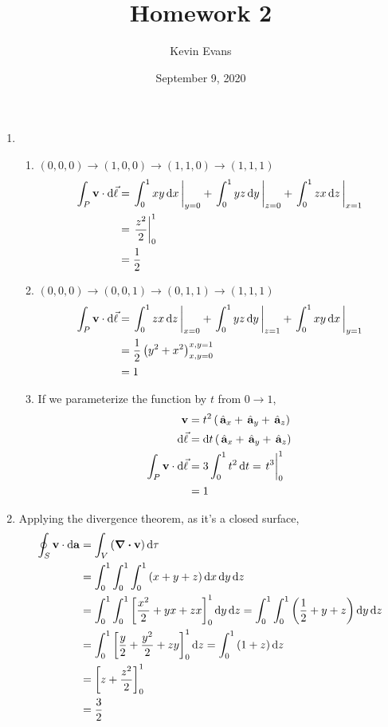 \documentclass{homework}
\title{Homework 2}
\author{Kevin Evans}
\date{September 9, 2020}
\begin{document}
	\maketitle

	\begin{enumerate}
		\item \begin{enumerate}
			\item $(0, 0, 0) \to (1, 0, 0) \to (1, 1, 0) \to (1, 1, 1)$ \begin{align*}
				\int_P \bvec{v} \cdot \dd{\vec{\ell}} & = \eval{\int_0^1 xy \dd{x}}_{y=0} + \eval{\int_0^1 yz \dd{y}}_{z=0} + \eval{\int_0^1 zx \dd{z}}_{x=1} \\
					& = \eval{\frac{z^2}{2}}_0^1 \\
					& = \frac{1}{2}
			\end{align*}
		
			\item $(0, 0, 0) \to (0, 0, 1) \to (0, 1, 1) \to (1, 1, 1)$
			\begin{align*}
				\int_P \bvec{v} \cdot \dd{\vec{\ell}} & = \eval{\int_0^1 zx \dd{z}}_{x=0} + \eval{\int_0^1 yz \dd{y}}_{z=1} + \eval{\int_{0}^{1} xy \dd{x}}_{y=1} \\
					& = \frac{1}{2} \left( y^2 + x^2 \right)_{x,y=0}^{x,y=1} \\
					& = 1
			\end{align*}
		
			\item If we parameterize the function by $t$ from $0 \to 1$, \begin{align*}
				\bvec{v} & = t^2 \left( \uvec{x} + \uvec{y} + \uvec{z}\right) \\
				\dd{\vec{\ell}} & = \dd{t} \left( \uvec{x} + \uvec{y} + \uvec{z} \right) \\
				\int_P \bvec{v} \cdot \dd{\vec{\ell}} & = 3 \int_{0}^1 t^2 \dd{t} = \eval{ t^3 }_0^1 \\
					& = 1
			\end{align*}
		\end{enumerate}
	
		\item Applying the divergence theorem, as it's a closed surface, \begin{align*}
			\oint_S \boldsymbol{\mathrm{v}} \cdot \dd{ \boldsymbol{\mathrm{a}} } & = \int_V \left(\div{ \boldsymbol{\mathrm{v}} }\right)  \dd{\tau} \\
				& = \int_0^1 \int_0^1 \int_0^1 \left( x + y + z\right) \dd{x} \dd{y} \dd{z} \\
				& = \int_0^1 \int_0^1 \left[ \frac{x^2}{2} + yx + zx\right]_0^1 \dd{y} \dd{z}
				= \int_0^1 \int_0^1 \left( \frac{1}{2} + y + z \right) \dd{y}\dd{z} \\
				& = \int_0^1 \left[\frac{y}{2} + \frac{y^2}{2} + zy\right]_0^1 \dd{z} = \int_0^1 \left(1 + z\right) \dd{z} \\
				& = \left[ z + \frac{z^2}{2} \right]_0^1 \\
				& = \frac{3}{2}
		\end{align*}
	

\end{enumerate}
\end{document}

